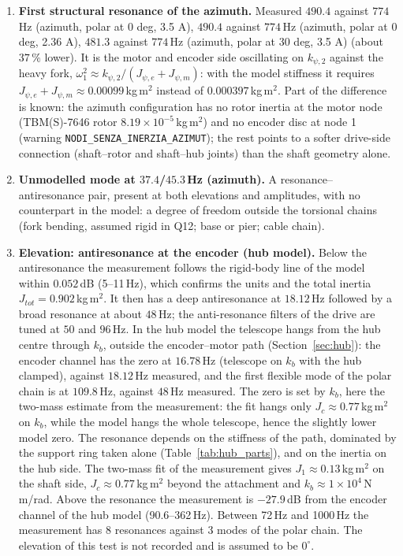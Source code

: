 \documentclass[10pt,a4paper]{article}
\numberwithin{equation}{section}
\begin{document}
\begin{enumerate}
\item \textbf{First structural resonance of the azimuth.} Measured $490.4$ against $774$\,Hz (azimuth, polar at 0 deg, 3.5 A), $490.4$ against $774$\,Hz (azimuth, polar at 0 deg, 2.36 A), $481.3$ against $774$\,Hz (azimuth, polar at 30 deg, 3.5 A) (about $37\,\%$ lower). It is the motor and encoder side oscillating on $k_{\psi,2}$ against the heavy fork, $\omega_1^2\approx k_{\psi,2}/(J_{\psi,e} + J_{\psi,m})$: with the model stiffness it requires $J_{\psi,e} + J_{\psi,m} \approx 0.00099$\,kg\,m$^2$ instead of $0.000397$\,kg\,m$^2$. Part of the difference is known: the azimuth configuration has no rotor inertia at the motor node (TBM(S)-7646 rotor $8.19\times10^{-5}$\,kg\,m$^2$) and no encoder disc at node 1 (warning \texttt{NODI\_SENZA\_INERZIA\_AZIMUT}); the rest points to a softer drive-side connection (shaft--rotor and shaft--hub joints) than the shaft geometry alone.
\item \textbf{Unmodelled mode at $37.4$/$45.3$\,Hz (azimuth).} A resonance--antiresonance pair, present at both elevations and amplitudes, with no counterpart in the model: a degree of freedom outside the torsional chains (fork bending, assumed rigid in Q12; base or pier; cable chain).
\item \textbf{Elevation: antiresonance at the encoder (hub model).} Below the antiresonance the measurement follows the rigid-body line of the model within $0.052$\,dB (5--11\,Hz), which confirms the units and the total inertia $J_{tot} = 0.902$\,kg\,m$^2$. It then has a deep antiresonance at $18.12$\,Hz followed by a broad resonance at about $48$\,Hz; the anti-resonance filters of the drive are tuned at $50$ and $96$\,Hz. In the hub model the telescope hangs from the hub centre through $k_b$, outside the encoder--motor path (Section~\ref{sec:hub}): the encoder channel has the zero at $16.78$\,Hz (telescope on $k_b$ with the hub clamped), against $18.12$\,Hz measured, and the first flexible mode of the polar chain is at $109.8$\,Hz, against $48$\,Hz measured. The zero is set by $k_b$, here the two-mass estimate from the measurement: the fit hangs only $J_c \approx 0.77$\,kg\,m$^2$ on $k_b$, while the model hangs the whole telescope, hence the slightly lower model zero. The resonance depends on the stiffness of the path, dominated by the support ring taken alone (Table~\ref{tab:hub_parts}), and on the inertia on the hub side. The two-mass fit of the measurement gives $J_1 \approx 0.13$\,kg\,m$^2$ on the shaft side, $J_c \approx 0.77$\,kg\,m$^2$ beyond the attachment and $k_b \approx 1\times10^{4}$\,N\,m/rad. Above the resonance the measurement is $-27.9$\,dB from the encoder channel of the hub model (90.6--362\,Hz). Between 72\,Hz and 1000\,Hz the measurement has 8 resonances against 3 modes of the polar chain. The elevation of this test is not recorded and is assumed to be $0^\circ$.

\end{enumerate}
\end{document}
